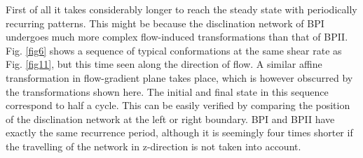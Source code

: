 \documentclass[aps,pre,reprint,superscriptaddress]{revtex4}
\begin{document}
First of all it takes considerably longer to reach the steady state with periodically recurring patterns.
This might be because the disclination network of BPI undergoes much more complex flow-induced transformations than that of BPII.
Fig. \ref{fig6} shows a sequence of typical conformations at the same shear rate as Fig. \ref{fig11}, but this time seen along the direction of flow.
A similar affine transformation in flow-gradient plane takes place, which is however obscurred by the transformations shown here. 
The initial and final state in this sequence correspond to half a cycle. 
This can be easily verified by comparing the position of the disclination network at the left or right boundary.
BPI and BPII have exactly the same recurrence period, although it is seemingly four times shorter if the travelling of the network in z-direction is not taken into account.  
\end{document}
